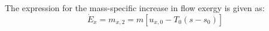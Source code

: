 The expression for the mass-specific increase in flow exergy is given as:  
\[
\dot{E}_x = m_{x,2} = m \left[ u_{x,0} - T_0 (s - s_0) \right]
\]